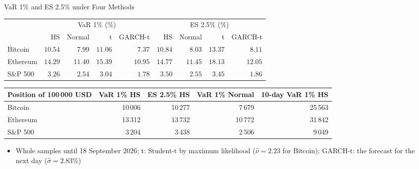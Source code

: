 \begin{frame}{VaR 1\% and ES 2.5\% under Four Methods}
\itemsize{\footnotesize}
\begin{center}
\scriptsize
\begin{tabular}{lrrrrrrrr}
\toprule
& \multicolumn{4}{c}{VaR 1\% (\%)} & \multicolumn{4}{c}{ES 2.5\% (\%)} \\ & HS & Normal & t & GARCH-t & HS & Normal & t & GARCH-t \\
\midrule
Bitcoin & $10.54$ & $7.99$ & $11.06$ & $7.37$ & $10.84$ & $8.03$ & $13.37$ & $8.11$ \\
Ethereum & $14.29$ & $11.40$ & $15.39$ & $10.95$ & $14.77$ & $11.45$ & $18.13$ & $12.05$ \\
S\&P 500 & $3.26$ & $2.54$ & $3.04$ & $1.78$ & $3.50$ & $2.55$ & $3.45$ & $1.86$ \\
\bottomrule
\end{tabular}
\end{center}
\begin{center}
\scriptsize
\begin{tabular}{lrrrr}
\toprule
Position of 100\,000 USD & VaR 1\% HS & ES 2.5\% HS & VaR 1\% Normal & 10-day VaR 1\% HS \\
\midrule
Bitcoin & 10\,006 & 10\,277 & 7\,679 & 25\,563 \\
Ethereum & 13\,312 & 13\,732 & 10\,772 & 31\,842 \\
S\&P 500 & 3\,204 & 3\,438 & 2\,506 & 9\,049 \\
\bottomrule
\end{tabular}
\end{center}
\begin{itemize}
    \item Whole samples until 18 September 2026; t: Student-t by maximum likelihood ($\hat\nu = 2.23$ for Bitcoin); GARCH-t: the forecast for the next day ($\hat\sigma = 2.83\%$)
\end{itemize}
\end{frame}

